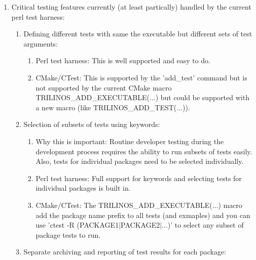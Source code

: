 \documentclass[pdf,ps2pdf,11pt]{SANDreport}
\begin{document}
\begin{enumerate}

{}\item Critical testing features currently (at least partically)
handled by the current perl test harness:

  \begin{enumerate}

  {}\item Defining different tests with same the executable but
  different sets of test arguments:

    \begin{enumerate}

    {}\item Perl test harness: This is well supported and easy to do.

    {}\item CMake/CTest: This is supported by the 'add\_test' command but is
    not supported by the current CMake macro
    TRILINOS\_ADD\_EXECUTABLE(...) but could be supported with a new
    macro (like TRILINOS\_ADD\_TEST(...)).

    \end{enumerate}

  {}\item Selection of subsets of tests using keywords:

    \begin{enumerate}

    {}\item Why this is important: Routine developer testing during
    the development process requires the ability to run subsets of
    tests easily.  Also, tests for individual packages need to be
    selected individually.

    {}\item Perl test harness: Full support for keywords and selecting
    tests for individual packages is built in.

    {}\item CMake/CTest: The TRILINOS\_ADD\_EXECUTABLE(...) macro add
    the package name prefix to all tests (and exmaples) and you can
    use 'ctest -R (PACKAGE1$|$PACKAGE2$|$...)' to select any subset of
    package tests to run.

    \end{enumerate}

  {}\item Separate archiving and reporting of test results for each
  package:

    \begin{enumerate}


\end{enumerate}
\end{enumerate}
\end{enumerate}
\end{document}

